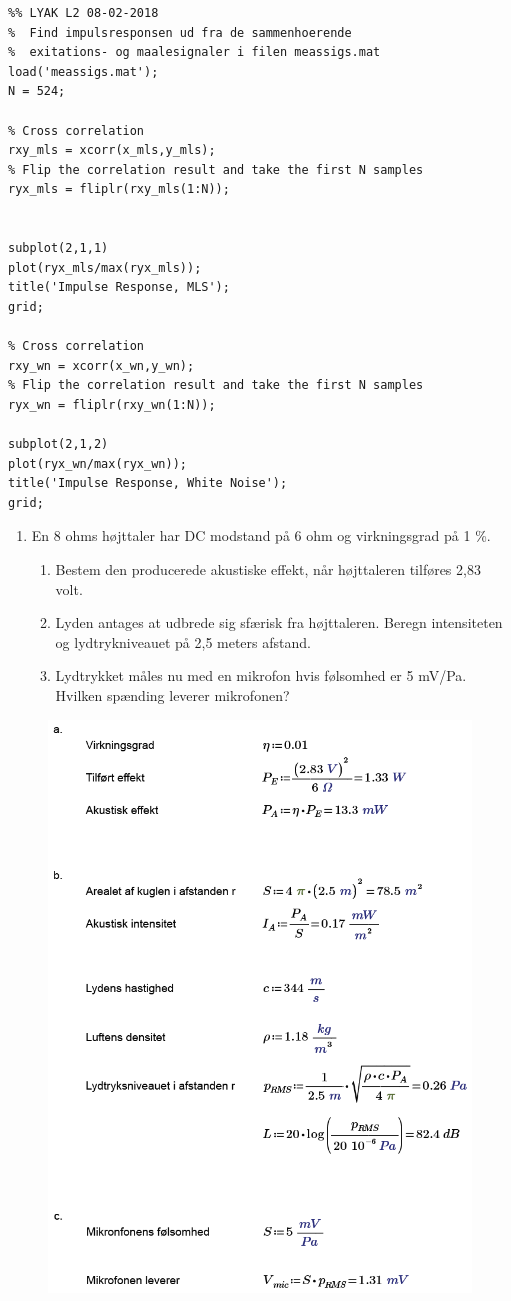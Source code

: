 \begin{lstlisting}
%% LYAK L2 08-02-2018
%  Find impulsresponsen ud fra de sammenhoerende 
%  exitations- og maalesignaler i filen meassigs.mat
load('meassigs.mat');
N = 524;

% Cross correlation
rxy_mls = xcorr(x_mls,y_mls);
% Flip the correlation result and take the first N samples
ryx_mls = fliplr(rxy_mls(1:N));   


subplot(2,1,1)
plot(ryx_mls/max(ryx_mls));
title('Impulse Response, MLS');
grid;

% Cross correlation
rxy_wn = xcorr(x_wn,y_wn);
% Flip the correlation result and take the first N samples
ryx_wn = fliplr(rxy_wn(1:N));  

subplot(2,1,2)
plot(ryx_wn/max(ryx_wn));
title('Impulse Response, White Noise');
grid;
\end{lstlisting}

\begin{enumerate}[resume]
	\item En 8 ohms højttaler har DC modstand på 6 ohm og virkningsgrad på 1 \%.
	\begin{enumerate}
		\item Bestem den producerede akustiske effekt, når højttaleren tilføres 2,83 volt.
		\item Lyden antages at udbrede sig sfærisk fra højttaleren. Beregn intensiteten og lydtrykniveauet på 2,5 meters afstand.
		\item Lydtrykket måles nu med en mikrofon hvis følsomhed er 5 mV/Pa. Hvilken spænding leverer mikrofonen?
	\end{enumerate}
\end{enumerate}

\begin{figure} [H]
	\includegraphics[width=\linewidth]{graphics/40.png}
\end{figure}



